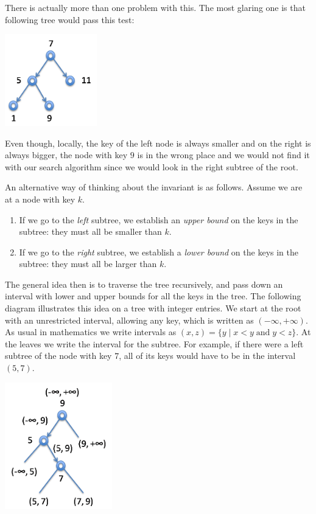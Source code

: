 \clearpage
There is actually more than one problem with this.  The most
glaring one is that following tree would pass this test:
\begin{center}
  \includegraphics[width=0.3\textwidth]{img/bst1.png}
\end{center}
Even though, locally, the key of the left node is always
smaller and on the right is always bigger, the node with
key $9$ is in the wrong place and we would not find it
with our search algorithm since we would look in the right
subtree of the root.

An alternative way of thinking about the invariant is as follows.
Assume we are at a node with key $k$.
\begin{enumerate}
\item If we go to the \emph{left} subtree, we establish an
\emph{upper bound} on the keys in the subtree: they must
all be smaller than $k$.
\item If we go to the \emph{right} subtree, we establish a
\emph{lower bound} on the keys in the subtree: they must
all be larger than $k$.
\end{enumerate}
The general idea then is to traverse the tree recursively, and pass
down an interval with lower and upper bounds for all the keys in the
tree.  The following diagram illustrates this idea on a tree with
integer entries.  We start at the
root with an unrestricted interval, allowing any key, which is written
as $(-\infty, +\infty)$.  As usual in mathematics we write intervals
as $(x,z) = \{y \mid x < y\;\mbox{and}\; y < z\}$.  At the leaves we
write the interval for the subtree.  For example, if there were a
left subtree of the node with key $7$, all of its keys would have
to be in the interval $(5,7)$.
\begin{center}
  \includegraphics[width=0.35\textwidth]{img/bst4.png}
\end{center}

